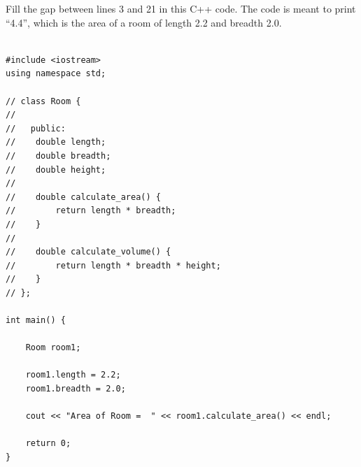 \question{}

Fill the gap between lines 3 and 21 in this C++ code. The code is meant to print ``4.4'', which is the area of a room of length 2.2 and breadth 2.0.


\begin{lstlisting}

#include <iostream>
using namespace std;

// class Room {
//
//   public:
//    double length;
//    double breadth;
//    double height;
//
//    double calculate_area() {
//        return length * breadth;
//    }
//
//    double calculate_volume() {
//        return length * breadth * height;
//    }
// };

int main() {

    Room room1;

    room1.length = 2.2;
    room1.breadth = 2.0;

    cout << "Area of Room =  " << room1.calculate_area() << endl;

    return 0;
}
\end{lstlisting}
